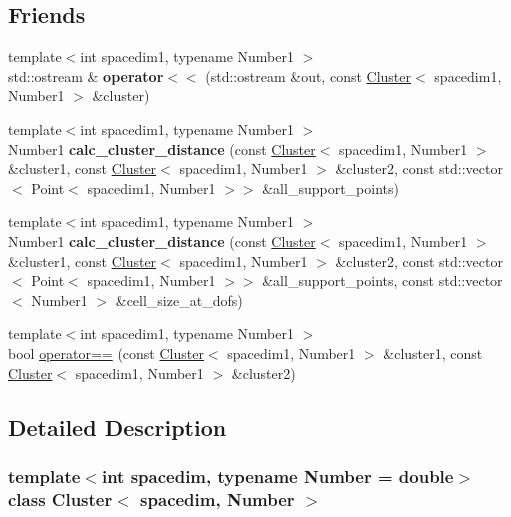 \subsection*{Friends}
\begin{DoxyCompactItemize}
\item 
\mbox{\label{classCluster_ad6f759d8c7460a9c5366f195df4dc57f}} 
{\footnotesize template$<$int spacedim1, typename Number1 $>$ }\\std\+::ostream \& {\bfseries operator$<$$<$} (std\+::ostream \&out, const \hyperlink{classCluster}{Cluster}$<$ spacedim1, Number1 $>$ \&cluster)
\item 
\mbox{\label{classCluster_af29091d511d3fa4e0118e39db2e36f21}} 
{\footnotesize template$<$int spacedim1, typename Number1 $>$ }\\Number1 {\bfseries calc\+\_\+cluster\+\_\+distance} (const \hyperlink{classCluster}{Cluster}$<$ spacedim1, Number1 $>$ \&cluster1, const \hyperlink{classCluster}{Cluster}$<$ spacedim1, Number1 $>$ \&cluster2, const std\+::vector$<$ Point$<$ spacedim1, Number1 $>$$>$ \&all\+\_\+support\+\_\+points)
\item 
\mbox{\label{classCluster_aeb29e01c4bc5a919856849fae7c53b21}} 
{\footnotesize template$<$int spacedim1, typename Number1 $>$ }\\Number1 {\bfseries calc\+\_\+cluster\+\_\+distance} (const \hyperlink{classCluster}{Cluster}$<$ spacedim1, Number1 $>$ \&cluster1, const \hyperlink{classCluster}{Cluster}$<$ spacedim1, Number1 $>$ \&cluster2, const std\+::vector$<$ Point$<$ spacedim1, Number1 $>$$>$ \&all\+\_\+support\+\_\+points, const std\+::vector$<$ Number1 $>$ \&cell\+\_\+size\+\_\+at\+\_\+dofs)
\item 
{\footnotesize template$<$int spacedim1, typename Number1 $>$ }\\bool \hyperlink{classCluster_a930aea4a53249004429d28f9631e495f}{operator==} (const \hyperlink{classCluster}{Cluster}$<$ spacedim1, Number1 $>$ \&cluster1, const \hyperlink{classCluster}{Cluster}$<$ spacedim1, Number1 $>$ \&cluster2)
\end{DoxyCompactItemize}


\subsection{Detailed Description}
\subsubsection*{template$<$int spacedim, typename Number = double$>$\newline
class Cluster$<$ spacedim, Number $>$}


